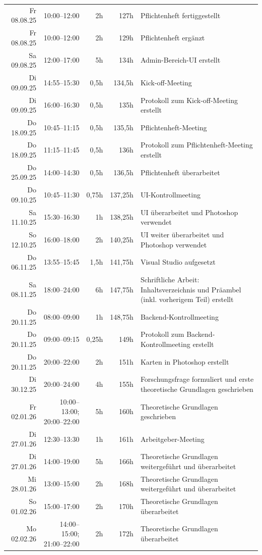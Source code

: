 \begin{longtable}{r | r | r | r | p{}}
	Fr 08.08.25 & 10:00--12:00 & 2h & 127h & Pflichtenheft fertiggestellt \\
	Fr 08.08.25 & 10:00--12:00 & 2h & 129h & Pflichtenheft ergänzt \\
	Sa 09.08.25 & 12:00--17:00 & 5h & 134h & Admin-Bereich-UI erstellt \\

	Di 09.09.25 & 14:55--15:30 & 0{,}5h & 134{,}5h & Kick-off-Meeting \\
	Di 09.09.25 & 16:00--16:30 & 0{,}5h & 135h & Protokoll zum Kick-off-Meeting erstellt \\
	Do 18.09.25 & 10:45--11:15 & 0{,}5h & 135{,}5h & Pflichtenheft-Meeting \\
	Do 18.09.25 & 11:15--11:45 & 0{,}5h & 136h & Protokoll zum Pflichtenheft-Meeting erstellt \\
	Do 25.09.25 & 14:00--14:30 & 0{,}5h & 136{,}5h & Pflichtenheft überarbeitet \\
	Do 09.10.25 & 10:45--11:30 & 0{,}75h & 137{,}25h & UI-Kontrollmeeting \\
	Sa 11.10.25 & 15:30--16:30 & 1h & 138{,}25h & UI überarbeitet und Photoshop verwendet \\
	So 12.10.25 & 16:00--18:00 & 2h & 140{,}25h & UI weiter überarbeitet und Photoshop verwendet \\

	Do 06.11.25 & 13:55--15:45 & 1{,}5h & 141{,}75h & Visual Studio aufgesetzt \\
	Sa 08.11.25 & 18:00--24:00 & 6h & 147{,}75h & Schriftliche Arbeit: Inhaltsverzeichnis und Präambel (inkl. vorherigem Teil) erstellt \\

	Do 20.11.25 & 08:00--09:00 & 1h & 148{,}75h & Backend-Kontrollmeeting \\
	Do 20.11.25 & 09:00--09:15 & 0{,}25h & 149h & Protokoll zum Backend-Kontrollmeeting erstellt \\
	Do 20.11.25 & 20:00--22:00 & 2h & 151h & Karten in Photoshop erstellt \\

	Di 30.12.25 & 20:00--24:00 & 4h & 155h & Forschungsfrage formuliert und erste theoretische Grundlagen geschrieben \\
	Fr 02.01.26 & 10:00--13:00; 20:00--22:00 & 5h & 160h & Theoretische Grundlagen geschrieben \\

	Di 27.01.26 & 12:30--13:30 & 1h & 161h & Arbeitgeber-Meeting \\
	Di 27.01.26 & 14:00--19:00 & 5h & 166h & Theoretische Grundlagen weitergeführt und überarbeitet \\
	Mi 28.01.26 & 13:00--15:00 & 2h & 168h & Theoretische Grundlagen weitergeführt und überarbeitet \\
	So 01.02.26 & 15:00--17:00 & 2h & 170h & Theoretische Grundlagen überarbeitet \\
	Mo 02.02.26 & 14:00--15:00; 21:00--22:00 & 2h & 172h & Theoretische Grundlagen überarbeitet \\


\end{longtable}
